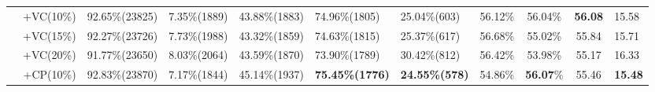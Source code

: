 \documentclass[a4paper]{article}
\begin{document}
\begin{table}[]
{\begin{tabular}{l|r|l|l|l|l|l|l|c|c|l|}
 & +VC(10\%)                                    & 92.65\%(23825)                                                                              & 7.35\%(1889)                                                                                    & 43.88\%(1883)                                                                                 & 74.96\%(1805)                                                                  & 25.04\%(603)                                                                & 56.12\%                       & 56.04\%                          & \textbf{56.08}      & 15.58                \\ \cline{2-11} 
 & +VC(15\%)                                    & 92.27\%(23726)                                                                              & 7.73\%(1988)                                                                                   & 43.32\%(1859)                                                                                 & 74.63\%(1815)                                                                  & 25.37\%(617)                                                                & 56.68\%                       & 55.02\%                          & 55.84               & 15.71                \\ \cline{2-11} 
 & +VC(20\%)                                    & 91.77\%(23650)                                                                              & 8.03\%(2064)                                                                                   & 43.59\%(1870)                                                                                 & 73.90\%(1789)                                                                  & 30.42\%(812)                                                                & 56.42\%                       & 53.98\%                          & 55.17               & 16.33                \\ \cline{2-11} 
 & +CP(10\%)                                    & 92.83\%(23870)                                                                            & 7.17\%(1844)                                                                                   & 45.14\%(1937)                                                                                 & \textbf{75.45\%(1776)}                                                                  & \textbf{24.55\%(578)}                                                                & 54.86\%                       & \textbf{56.07}\%                          & 55.46               & \textbf{15.48}               \\ \cline{2-11} 

\end{tabular}}
\end{table}
\end{document}
